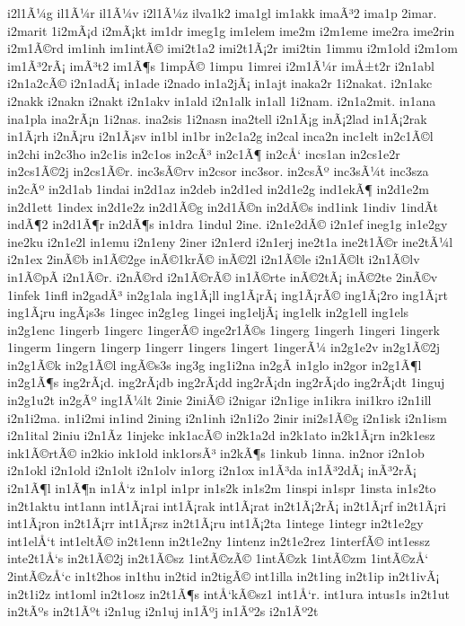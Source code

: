 {i2l1Ã¼g
il1Ã¼r
il1Ã¼v
i2l1Ã¼z
ilva1k2
ima1gl
im1akk
imaÃ³2
ima1p
2imar.
i2marit
1i2mÃ¡d
i2mÃ¡kt
im1dr
imeg1g
im1elem
ime2m
i2m1eme
ime2ra
ime2rin
i2m1Ã©rd
im1inh
im1intÃ©
imi2t1a2
imi2t1Ã¡2r
imi2tin
1immu
i2m1old
i2m1om
im1Ã³2rÃ¡
imÃ³t2
im1Ã¶s
1impÃ©
1impu
1imrei
i2m1Ã¼r
imÅ±t2r
i2n1abl
i2n1a2cÃ©
i2n1adÃ¡
in1ade
i2nado
in1a2jÃ¡
in1ajt
inaka2r
1i2nakat.
i2n1akc
i2nakk
i2nakn
i2nakt
i2n1akv
in1ald
i2n1alk
in1all
1i2nam.
i2n1a2mit.
in1ana
ina1pla
ina2rÃ¡n
1i2nas.
ina2sis
1i2nasn
ina2tell
i2n1Ã¡g
inÃ¡2lad
in1Ã¡2rak
in1Ã¡rh
i2nÃ¡ru
i2n1Ã¡sv
in1bl
in1br
in2c1a2g
in2cal
inca2n
inc1elt
in2c1Ã©l
in2chi
in2c3ho
in2c1is
in2c1os
in2cÃ³
in2c1Ã¶
in2cÅ‘
incs1an
in2cs1e2r
in2cs1Ã©2j
in2cs1Ã©r.
inc3sÃ©rv
in2csor
inc3sor.
in2csÃº
inc3sÃ¼t
inc3sza
in2cÃº
in2d1ab
1indai
in2d1az
in2deb
in2d1ed
in2d1e2g
ind1ekÃ¶
in2d1e2m
in2d1ett
1index
in2d1e2z
in2d1Ã©g
in2d1Ã©n
in2dÃ©s
ind1ink
1indiv
1indÃ­t
indÃ¶2
in2d1Ã¶r
in2dÃ¶s
in1dra
1indul
2ine.
i2n1e2dÃ©
i2n1ef
ineg1g
in1e2gy
ine2ku
i2n1e2l
in1emu
i2n1eny
2iner
i2n1erd
i2n1erj
ine2t1a
ine2t1Ã©r
ine2tÃ¼l
i2n1ex
2inÃ©b
in1Ã©2ge
inÃ©1krÃ©
inÃ©2l
i2n1Ã©le
i2n1Ã©lt
i2n1Ã©lv
in1Ã©pÃ­
i2n1Ã©r.
i2nÃ©rd
i2n1Ã©rÃ©
in1Ã©rte
inÃ©2tÃ¡
inÃ©2te
2inÃ©v
1infek
1infl
in2gadÃ³
in2g1ala
ing1Ã¡ll
ing1Ã¡rÃ¡
ing1Ã¡rÃ©
ing1Ã¡2ro
ing1Ã¡rt
ing1Ã¡ru
ingÃ¡s3s
1ingec
in2g1eg
1ingei
ing1eljÃ¡
ing1elk
in2g1ell
ing1els
in2g1enc
1ingerb
1ingerc
1ingerÃ©
inge2r1Ã©s
1ingerg
1ingerh
1ingeri
1ingerk
1ingerm
1ingern
1ingerp
1ingerr
1ingers
1ingert
1ingerÃ¼
in2g1e2v
in2g1Ã©2j
in2g1Ã©k
in2g1Ã©l
ingÃ©s3s
ing3g
ing1i2na
in2gÃ­
in1glo
in2gor
in2g1Ã¶l
in2g1Ã¶s
ing2rÃ¡d.
ing2rÃ¡db
ing2rÃ¡dd
ing2rÃ¡dn
ing2rÃ¡do
ing2rÃ¡dt
1inguj
in2g1u2t
in2gÃº
ing1Ã¼lt
2inie
2iniÃ©
i2nigar
i2n1ige
in1ikra
ini1kro
i2n1ill
i2n1i2ma.
in1i2mi
in1ind
2ining
i2n1inh
i2n1i2o
2inir
ini2s1Ã©g
i2n1isk
i2n1ism
i2n1ital
2iniu
i2n1Ã­z
1injekc
ink1acÃ©
in2k1a2d
in2k1ato
in2k1Ã¡rn
in2k1esz
ink1Ã©rtÃ©
in2kio
ink1old
ink1orsÃ³
in2kÃ¶s
1inkub
1inna.
in2nor
i2n1ob
i2n1okl
i2n1old
i2n1olt
i2n1olv
in1org
i2n1ox
in1Ã³da
in1Ã³2dÃ¡
inÃ³2rÃ¡
i2n1Ã¶l
in1Ã¶n
in1Å‘z
in1pl
in1pr
in1s2k
in1s2m
1inspi
in1spr
1insta
in1s2to
in2t1aktu
int1ann
int1Ã¡rai
int1Ã¡rak
int1Ã¡rat
in2t1Ã¡2rÃ¡
in2t1Ã¡rf
in2t1Ã¡ri
int1Ã¡ron
in2t1Ã¡rr
int1Ã¡rsz
in2t1Ã¡ru
int1Ã¡2ta
1intege
1integr
in2t1e2gy
int1elÅ‘t
int1eltÃ©
in2t1enn
in2t1e2ny
1intenz
in2t1e2rez
1interfÃ©
int1essz
inte2t1Å‘s
in2t1Ã©2j
in2t1Ã©sz
1intÃ©zÃ©
1intÃ©zk
1intÃ©zm
1intÃ©zÅ‘
2intÃ©zÅ‘c
in1t2hos
in1thu
in2tid
in2tigÃ©
int1illa
in2t1ing
in2t1ip
in2t1ivÃ¡
in2t1i2z
int1oml
in2t1osz
in2t1Ã¶s
intÅ‘kÃ©sz1
int1Å‘r.
int1ura
intus1s
in2t1ut
in2tÃºs
in2t1Ãºt
i2n1ug
i2n1uj
in1Ãºj
in1Ãº2s
i2n1Ãº2t
}
